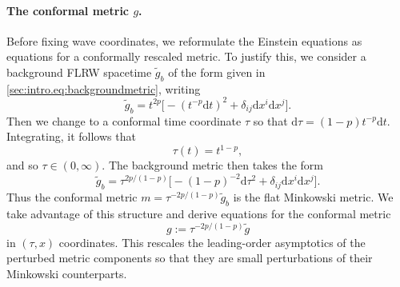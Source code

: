 \documentclass{article}
\newcommand{\de}{\mathrm{d}}
\newcommand{\wt}{\widetilde}
\begin{document}
\paragraph{The conformal metric \texorpdfstring{$g$}{g}.}
Before fixing wave coordinates, we reformulate the Einstein equations as equations for a conformally rescaled metric. To justify this, we consider a background FLRW spacetime $\wt{g}_b$ of the form given in \eqref{sec:intro.eq:backgroundmetric}, writing
\begin{equation}
    \wt{g}_b = t^{2p}\Big[-(t^{-p}\de t)^2 + \delta_{ij}\de x^i \de x^j\Big].
\end{equation}
Then we change to a conformal time coordinate $\tau$ so that $\de \tau = (1-p)t^{-p}\de t$. Integrating, it follows that
\begin{equation}
    \tau(t) = t^{1-p},
\end{equation}
and so $\tau \in (0,\infty)$. The background metric then takes the form
\begin{equation}
        \wt{g}_b = \tau^{2p/(1-p)}\big[-(1-p)^{-2}\de \tau^2 + \delta_{ij}\de x^i\de x^j\big].
\end{equation}
Thus the conformal metric $m = \tau^{-2p/(1-p)}\wt{g}_b$ is the flat Minkowski metric. We take advantage of this structure and derive equations for the conformal metric 
\begin{equation}
    g := \tau^{-2p/(1-p)}\wt{g}
\end{equation}
in $(\tau,x)$ coordinates. This rescales the leading-order asymptotics of the perturbed metric components so that they are small perturbations of their Minkowski counterparts.
\end{document}
